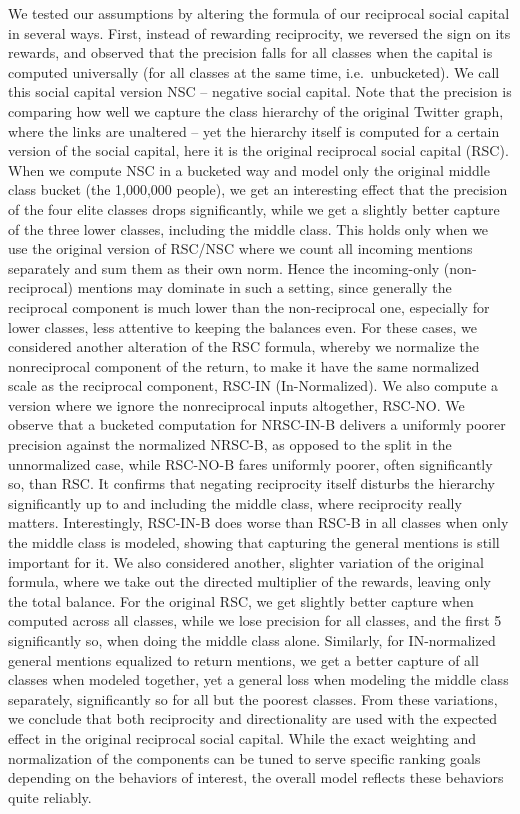 \documentclass[10pt,oneside]{memoir}
\begin{document}
\begin{Spacing}{2}
We tested our assumptions by altering the formula of our reciprocal social capital in several ways.  First, instead of rewarding reciprocity, we reversed the sign on its rewards, and observed that the precision falls for all classes when the capital is computed universally (for all classes at the same time, i.e.\ unbucketed).  We call this social capital version NSC -- negative social capital.  Note that the precision is comparing how well we capture the class hierarchy of the original Twitter graph, where the links are unaltered -- yet the hierarchy itself is computed for a certain version of the social capital, here it is the original reciprocal social capital (RSC).
When we compute NSC in a bucketed way and model only the original middle class bucket (the 1,000,000 people), we get an interesting effect that the precision of the four elite classes drops significantly, while we get a slightly better capture of the three lower classes, including the middle class.  This holds only when we use the original version of RSC/NSC where we count all incoming mentions separately and sum them as their own norm.  Hence the incoming-only (non-reciprocal) mentions may dominate in such a setting, since generally the reciprocal component is much lower than the non-reciprocal one, especially for lower classes, less attentive to keeping the balances even.
For these cases, we considered another alteration of the RSC formula, whereby we normalize the nonreciprocal component of the return, to make it have the same normalized scale as the reciprocal component, RSC-IN (In-Normalized).  We also compute a version where we ignore the nonreciprocal inputs altogether, RSC-NO. We observe that a bucketed computation for NRSC-IN-B delivers a uniformly poorer precision against the normalized NRSC-B, as opposed to the split in the unnormalized case, while RSC-NO-B fares uniformly poorer, often significantly so, than RSC.  It confirms that negating reciprocity itself disturbs the hierarchy significantly up to and including the middle class, where reciprocity really matters.  Interestingly, RSC-IN-B does worse than RSC-B in all classes when only the middle class is modeled, showing that capturing the general mentions is still important for it.
We also considered another, slighter variation of the original formula, where we take out the directed multiplier of the rewards, leaving only the total balance.  For the original RSC, we get slightly better capture when computed across all classes, while we lose precision for all classes, and the first 5 significantly so, when doing the middle class alone.  Similarly, for IN-normalized general mentions equalized to return mentions, we get a better capture of all classes when modeled together, yet a general loss when modeling the middle class separately, significantly so for all but the poorest classes.
From these variations, we conclude that both reciprocity and directionality are used with the expected effect in the original reciprocal social capital.  While the exact weighting and normalization of the components can be tuned to serve specific ranking goals depending on the behaviors of interest, the overall model reflects these behaviors quite reliably.



\end{Spacing}
\end{document}
